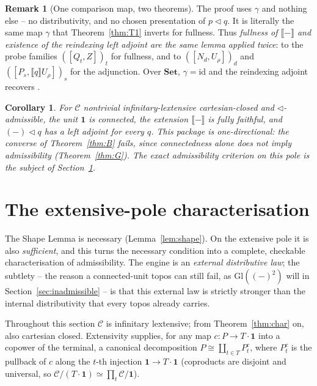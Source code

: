 \documentclass[11pt]{amsart}
\theoremstyle{plain}
\newtheorem{corollary}[theorem]{Corollary}
\theoremstyle{definition}
\newtheorem{remark}[theorem]{Remark}
\newcommand{\C}{\mathcal{C}}
\newcommand{\ext}[1]{\llbracket #1 \rrbracket}
\newcommand{\Setb}{\mathbf{Set}}
\newcommand{\Gl}{\mathrm{Gl}}
\newcommand{\comp}{\mathbin{\triangleleft}}
\newcommand{\one}{\mathbf{1}}
\begin{document}
\begin{remark}[One comparison map, two theorems]\label{rem:onelemma}
The proof uses $\gamma$ and nothing else -- no distributivity, and no chosen presentation of
$p\comp q$. It is literally the same map $\gamma$ that Theorem~\ref{thm:T1} inverts for fullness.
Thus \emph{fullness of $\ext{-}$ and existence of the reindexing left adjoint are the same lemma
applied twice}: to the probe families $([Q_t,Z])_t$ for fullness, and to $([N_d,U_\rho])_d$ and
$([P_s,\ext q U_\rho])_s$ for the adjunction. Over $\Setb$, $\gamma=\mathrm{id}$ and the reindexing
adjoint recovers \cite[Prop.~6.57]{NiuSpivak}.
\end{remark}

\begin{corollary}\label{cor:extensive-equiv}
For $\C$ nontrivial infinitary-lextensive cartesian-closed and $\comp$-admissible, the unit $\one$ is
connected, the extension $\ext{-}$ is fully faithful, and $({-})\comp q$ has a left adjoint for every
$q$. This package is one-directional: the converse of Theorem~\ref{thm:B} fails, since connectedness
alone does not imply admissibility (Theorem~\ref{thm:G}). The exact admissibility criterion on this
pole is the subject of Section~\ref{sec:char}.
\end{corollary}

\section{The extensive-pole characterisation}\label{sec:char}

The Shape Lemma is necessary (Lemma~\ref{lem:shape}). On the extensive pole it is also
\emph{sufficient}, and this turns the necessary condition into a complete, checkable characterisation
of admissibility. The engine is an \emph{external distributive law}; the subtlety -- the reason a
connected-unit topos can still fail, as $\Gl((-)^2)$ will in Section~\ref{sec:inadmissible} -- is that
this external law is strictly stronger than the internal distributivity that every topos already
carries.

Throughout this section $\C$ is infinitary lextensive; from Theorem~\ref{thm:char} on, also cartesian
closed. Extensivity supplies, for any map $c:P\to T\cdot\one$ into a copower of the terminal, a
canonical decomposition $P\cong\coprod_{t\in T}P^c_t$, where $P^c_t$ is the pullback of $c$ along the
$t$-th injection $\one\to T\cdot\one$ (coproducts are disjoint and universal, so $\C/(T\cdot\one)\simeq
\prod_t\C/\one$).
\end{document}
